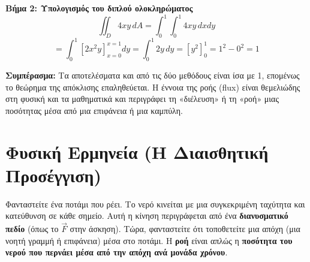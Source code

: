 \documentclass[a4paper,12pt,twoside]{article}
\newcommand{\en}[1]{{\selectlanguage{english}#1\selectlanguage{greek}}}
\begin{document}
\noindent
\textbf{Βήμα 2: Υπολογισμός του διπλού ολοκληρώματος}
\[ \iint_D 4xy \, dA = \int_0^1 \int_0^1 4xy \, dx dy \]
\[ = \int_0^1 \left[ 2x^2 y \right]_{x=0}^{x=1} dy = \int_0^1 2y \, dy = \left[ y^2 \right]_0^1 = 1^2 - 0^2 = 1 \]

\noindent
\textbf{Συμπέρασμα:}
Τα αποτελέσματα και από τις δύο μεθόδους είναι ίσα με 1, επομένως το θεώρημα της απόκλισης επαληθεύεται.
\newpage
Η έννοια της ροής (\en{flux}) είναι θεμελιώδης στη φυσική και τα μαθηματικά και περιγράφει τη «διέλευση» ή τη «ροή» μιας ποσότητας μέσα από μια επιφάνεια ή μια καμπύλη.

\section{Φυσική Ερμηνεία (Η Διαισθητική Προσέγγιση)}

Φανταστείτε ένα ποτάμι που ρέει. Το νερό κινείται με μια συγκεκριμένη ταχύτητα και κατεύθυνση σε κάθε σημείο. Αυτή η κίνηση περιγράφεται από ένα \textbf{διανυσματικό πεδίο} (όπως το $\vec{F}$ στην άσκηση). Τώρα, φανταστείτε ότι τοποθετείτε μια απόχη (μια νοητή γραμμή ή επιφάνεια) μέσα στο ποτάμι. Η \textbf{ροή} είναι απλώς η \textbf{ποσότητα του νερού που περνάει μέσα από την απόχη ανά μονάδα χρόνου}.

\begin{center}
\end{center}
\end{document}
